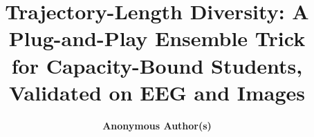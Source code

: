 \documentclass{article}
\title{Trajectory-Length Diversity: A Plug-and-Play Ensemble Trick\\
for Capacity-Bound Students, Validated on EEG and Images}
\author{\textbf{Anonymous Author(s)}}
\begin{document}
\maketitle









\newpage
{\small


}

\newpage

\end{document}
